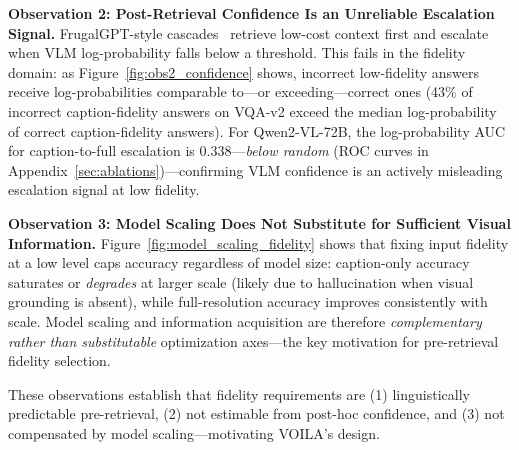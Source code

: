 \textbf{Observation 2: Post-Retrieval Confidence Is an Unreliable Escalation Signal.}
FrugalGPT-style cascades~\cite{chen2023frugalgpt} retrieve low-cost context first and escalate when VLM log-probability falls below a threshold.
This fails in the fidelity domain: as Figure~\ref{fig:obs2_confidence} shows, incorrect low-fidelity answers receive log-probabilities comparable to---or exceeding---correct ones (43\% of incorrect caption-fidelity answers on VQA-v2 exceed the median log-probability of correct caption-fidelity answers).
For Qwen2-VL-72B, the log-probability AUC for caption-to-full escalation is 0.338---\emph{below random} (ROC curves in Appendix~\ref{sec:ablations})---confirming VLM confidence is an actively misleading escalation signal at low fidelity.

\textbf{Observation 3: Model Scaling Does Not Substitute for Sufficient Visual Information.}
Figure~\ref{fig:model_scaling_fidelity} shows that fixing input fidelity at a low level caps accuracy regardless of model size: caption-only accuracy saturates or \emph{degrades} at larger scale (likely due to hallucination when visual grounding is absent), while full-resolution accuracy improves consistently with scale.
Model scaling and information acquisition are therefore \emph{complementary rather than substitutable} optimization axes---the key motivation for pre-retrieval fidelity selection.

These observations establish that fidelity requirements are (1) linguistically predictable pre-retrieval, (2) not estimable from post-hoc confidence, and (3) not compensated by model scaling---motivating \textsc{VOILA}'s design.

